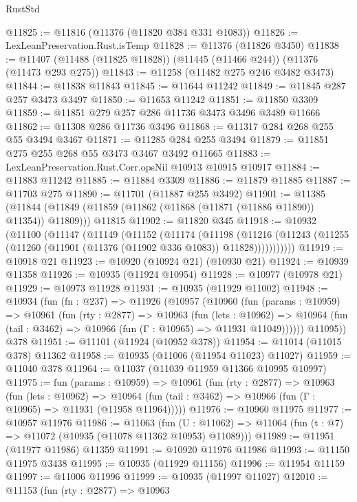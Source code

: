 \begin{lexlean}{RustStd}
\begin{coremodule}
{\begin{coremodule}
{{{{{{{{{{{{{{{{{{{{{{{{{{{{{{{{{{{{{{{{{{{{{{{{{{{{{{{{{{{{{{{{{{{{{{{{{{{{{{{{{{{{{@11825 := @11816 (@11376 (@11820 @384 @331 @1083))
@11826 := LexLeanPreservation.Rust.isTemp
@11828 := @11376 (@11826 @3450)
@11838 := @11407 (@11488 (@11825 @11828)) (@11445 (@11466 @244)) (@11376 (@11473 @293 @275))
@11843 := @11258 (@11482 @275 @246 @3482 @3473)
@11844 := @11838 @11843
@11845 := @11644 @11242
@11849 := @11845 @287 @257 @3473 @3497
@11850 := @11653 @11242
@11851 := @11850 @3309
@11859 := @11851 @279 @257 @286 @11736 @3473 @3496 @3489 @11666
@11862 := @11308 @286 @11736 @3496
@11868 := @11317 @284 @268 @255 @55 @3494 @3467
@11871 := @11285 @284 @255 @3494
@11879 := @11851 @275 @255 @268 @55 @3473 @3467 @3492 @11665
@11883 := LexLeanPreservation.Rust.Corr.opsNil @10913 @10915 @10917
@11884 := @11883 @11242
@11885 := @11884 @3309
@11886 := @11879 @11885
@11887 := @11703 @275
@11890 := @11701 (@11887 @255 @3492)
@11901 := @11385
    (@11844 (@11849 (@11859 (@11862 (@11868 (@11871 (@11886 @11890)) @11354)) @11809)))
    @11815
@11902 := @11820 @345
@11918 := @10932
    (@11100
      (@11147
        (@11149
          (@11152
            (@11174
              (@11198
                (@11216
                  (@11243 (@11255 (@11260 (@11901 (@11376 (@11902 @336 @1083)) @11828)))))))))))
@11919 := @10918 @21
@11923 := @10920 (@10924 @21) (@10930 @21)
@11924 := @10939 @11358
@11926 := @10935 (@11924 @10954)
@11928 := @10977 (@10978 @21)
@11929 := @10973 @11928
@11931 := @10935 (@11929 @11002)
@11948 := @10934
    (fun (fn : @237) =>
    @11926
      (@10957
        (@10960
          (fun (params : @10959) =>
          @10961
            (fun (rty : @2877) =>
            @10963
              (fun (lets : @10962) =>
              @10964 (fun (tail : @3462) => @10966 (fun (Γ : @10965) => @11931 @11049))))))
        @11095))
    @378
@11951 := @11101 (@11924 (@10952 @378))
@11954 := @11014 (@11015 @378) @11362
@11958 := @10935 (@11006 (@11954 @11023) @11027)
@11959 := @11040 @378
@11964 := @11037 (@11039 @11959 @11366 @10995 @10997)
@11975 := fun (params : @10959) =>
  @10961
    (fun (rty : @2877) =>
    @10963
      (fun (lets : @10962) =>
      @10964 (fun (tail : @3462) => @10966 (fun (Γ : @10965) => @11931 (@11958 @11964)))))
@11976 := @10960 @11975
@11977 := @10957 @11976
@11986 := @11063
    (fun (U : @11062) => @11064 (fun (t : @7) => @11072 (@10935 (@11078 @11362 @10953) @11089)))
@11989 := @11951 (@11977 @11986) @11359
@11991 := @10920 @11976 @11986
@11993 := @11150 @11975 @3438
@11995 := @10935 (@11929 @11156)
@11996 := @11954 @11159
@11997 := @11006 @11996
@11999 := @10935 (@11997 @11027)
@12010 := @11153
    (fun (rty : @2877) =>
    @10963
}}}}}}}}}}}}}}}}}}}}}}}}}}}}}}}}}}}}}}}}}}}}}}}}}}}}}}}}}}}}}}}}}}}}}}}}}}}}}}}}}}}}}
\end{coremodule}}
\end{coremodule}
\end{lexlean}
